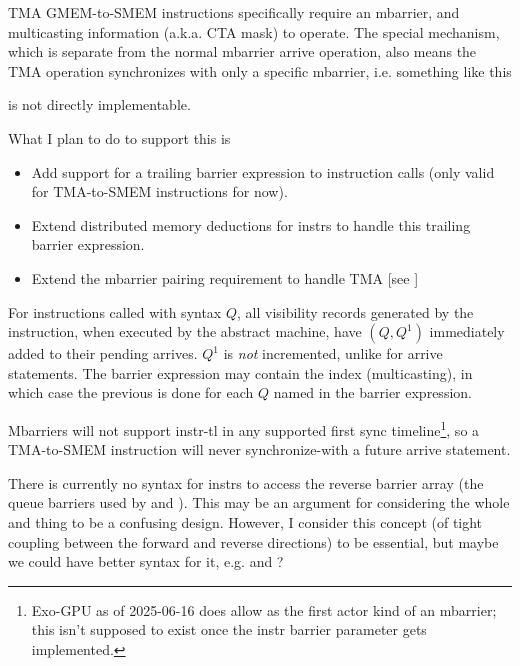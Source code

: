 TMA GMEM-to-SMEM instructions specifically require an mbarrier, and multicasting information (a.k.a. CTA mask) to operate.
The special  mechanism, which is separate from the normal mbarrier arrive operation, also means the TMA operation synchronizes with only a specific mbarrier, i.e. something like this



is not directly implementable.

\filbreak
What I plan to do to support this is
\begin{itemize}
  \item Add support for a trailing barrier expression  to instruction calls (only valid for TMA-to-SMEM instructions for now).
  \filbreak
  \item Extend distributed memory deductions for instrs to handle this trailing barrier expression.
  \filbreak
  \item Extend the mbarrier pairing requirement to handle TMA [see ]
\end{itemize}

\filbreak
{}

For instructions called with syntax  $Q$, all visibility records generated by the instruction, when executed by the abstract machine, have $(Q, Q^1)$ immediately added to their pending arrives.
$Q^1$ is \textit{not} incremented, unlike for arrive statements.
The barrier expression may contain the \lighttt{:} index (multicasting), in which case the previous is done for each $Q$ named in the barrier expression.

\filbreak
Mbarriers will not support  instr-tl in any supported first sync timeline\footnote{Exo-GPU as of 2025-06-16 does allow  as the first actor kind of an mbarrier; this isn't supposed to exist once the instr barrier parameter gets implemented.}, so a TMA-to-SMEM instruction will never synchronize-with a future arrive statement.

\filbreak
There is currently no syntax for instrs to access the reverse barrier array (the queue barriers used by  and ).
This may be an argument for considering the whole  and  thing to be a confusing design.
However, I consider this concept (of tight coupling between the forward and reverse directions) to be essential, but maybe we could have better syntax for it, e.g.  and ?

